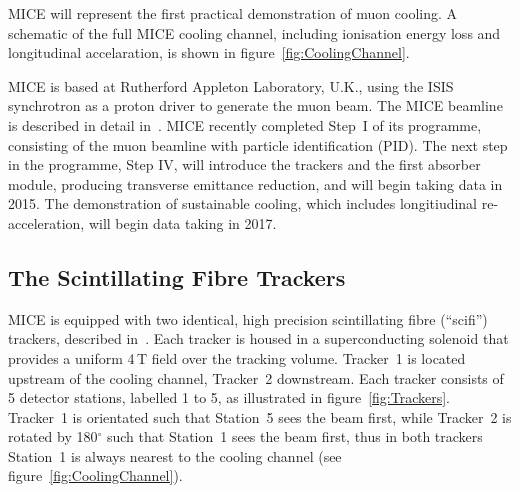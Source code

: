   MICE will represent the first practical demonstration of muon cooling. A schematic of the full MICE cooling channel, including ionisation energy loss and longitudinal accelaration, is shown in figure~\ref{fig:CoolingChannel}.

  MICE is based at Rutherford Appleton Laboratory, U.K., using the ISIS synchrotron as a proton driver to generate the muon beam.  The MICE beamline is described in detail in~\cite{MiceBeamline}.  MICE recently completed Step~I of its programme, consisting of the muon beamline with particle identification (PID). The next step in the programme, Step IV, will introduce the trackers and the first absorber module, producing transverse emittance reduction, and will begin taking data in 2015. The demonstration of sustainable cooling, which includes longitiudinal re-acceleration, will begin data taking in 2017.


  \subsection{The Scintillating Fibre Trackers}
  \label{subsec:Trackers}
  MICE is equipped with two identical, high precision scintillating fibre (``scifi'') trackers, described in~\cite{MiceTrackers}. Each tracker is housed in a superconducting solenoid that provides a uniform 4\,T field over the tracking volume. Tracker~1 is located upstream of the cooling channel, Tracker~2 downstream.  Each tracker consists of 5 detector stations, labelled 1 to 5, as illustrated in figure~\ref{fig:Trackers}. Tracker~1 is orientated such that Station~5 sees the beam first, while Tracker~2 is rotated by 180$^\circ$ such that Station~1 sees the beam first, thus in both trackers Station~1 is always nearest to the cooling channel (see figure~\ref{fig:CoolingChannel}).
  

